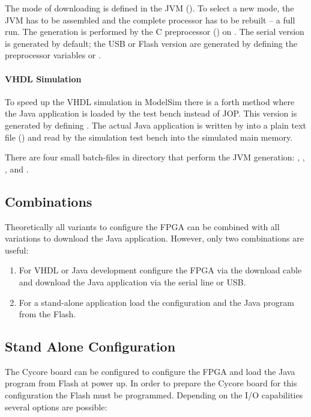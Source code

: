 The mode of downloading is defined in the JVM (). To
select a new mode, the JVM has to be assembled and the complete
processor has to be rebuilt -- a full  run. The generation
is performed by the C preprocessor () on . The
serial version is generated by default; the USB or Flash version are
generated by defining the preprocessor variables  or
.

\paragraph{VHDL Simulation}

To speed up the VHDL simulation in ModelSim
there is a forth method where the Java application is loaded by the
test bench instead of JOP. This version is generated by defining
. The actual Java application is written by
 into a plain text file () and read
by the simulation test bench into the simulated main memory.

There are four small batch-files in directory  that
perform the JVM generation: , ,
, and .

\subsection{Combinations}

Theoretically all variants to configure the FPGA can be combined with
all variations to download the Java application. However, only two
combinations are useful:

\begin{enumerate}
    \item For VHDL or Java development configure the FPGA
    via the download cable and download the Java application
    via the serial line or USB.
    \item For a stand-alone application load the configuration and
    the Java program from the Flash.
\end{enumerate}

\subsection{Stand Alone Configuration}

The Cycore board can be configured to configure the FPGA and load the
Java program from Flash at power up. In order to prepare the Cycore
board for this configuration the Flash must be programmed. Depending
on the I/O capabilities several options are possible:

